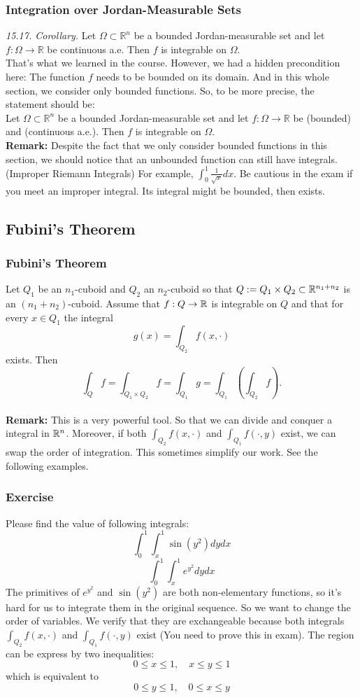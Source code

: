 \documentclass[10pt, t]{beamer}
\renewcommand{\emph}[1]{{\color{Turquoise3}\textsl{#1}}}
\newcommand{\nullspace}{~\\[15pt]}
\begin{document}
\begin{frame}
    \frametitle{Integration over Jordan-Measurable Sets}
    \emph{15.17. Corollary.} Let $\Omega \subset \mathbb{R}^{n}$ be a bounded Jordan-measurable set and let $f: \Omega \rightarrow \mathbb{R}$ be continuous a.e. Then $f$ is integrable on $\Omega$.
    \nullspace
    That's what we learned in the course. However, we had a hidden precondition here: The function $f$ needs to be bounded on its domain. And in this whole section, we consider only bounded functions. So, to be more precise, the statement should be:
    \nullspace
    Let $\Omega \subset \mathbb{R}^{n}$ be a bounded Jordan-measurable set and let $f: \Omega \rightarrow \mathbb{R}$ be (bounded) and (continuous a.e.). Then $f$ is integrable on $\Omega$.
    \nullspace
    \textbf{Remark:} Despite the fact that we only consider bounded functions in this
    section, we should notice that an unbounded function can still have
    integrals. (Improper Riemann Integrals) For example, $\int_0^1\frac{1}{\sqrt{x}}dx$. Be cautious in the exam if you meet an improper integral. Its integral might be bounded, then exists.
\end{frame}

\subsection{Fubini's Theorem}
\begin{frame}
    \frametitle{Fubini's Theorem}
    Let $Q_1$ be an $n_1$-cuboid and $Q_2$ an $n_2$-cuboid so that $Q:=Q_1\times Q_2\subset\mathbb{R}^{n_1+n_2}$ is an $(n_1+n_2)$-cuboid. Assume that $f:Q\to\mathbb{R}$ is integrable on $Q$ and that for every $x\in Q_1$ the integral
    \[g(x)=\int_{Q_2}f(x,\cdot)\]
    exists. Then
    \[\int_Qf=\int_{Q_1\times Q_2}f=\int_{Q_1}g=\int_{Q_1}\left(\int_{Q_2}f\right).\]
    \nullspace
    \textbf{Remark:} This is a very powerful tool. So that we can divide and conquer a integral in $\mathbb{R}^n$. Moreover, if both $\int_{Q_2}f(x,\cdot)$ and $\int_{Q_1}f(\cdot,y)$ exist, we can swap the order of integration. This sometimes simplify our work. See the following examples.
\end{frame}


\begin{frame}
    \frametitle{Exercise}
    Please find the value of following integrals:
    $$\int_{0}^{1} \int_{x}^{1} \sin \left(y^{2}\right) d y d x$$
    $$\int_{0}^{1} \int_{x}^{1} e^{y^{2}} d y d x$$
    \pause
    The primitives of $e^{y^{2}}$ and $\sin \left(y^{2}\right)$ are both non-elementary functions, so it's hard for us to integrate them in the original sequence. So we want to change the order of variables. We verify that they are exchangeable because both integrals $\int_{Q_2}f(x,\cdot)$ and $\int_{Q_1}f(\cdot,y)$ exist (You need to prove this in exam). The region can be express by two inequalities:
    \[
        0 \leq x \leq 1, \quad x \leq y \leq 1
    \]
    which is equivalent to
    \[
        0 \leq y \leq 1, \quad 0 \leq x \leq y
    \]
\end{frame}
\end{document}
